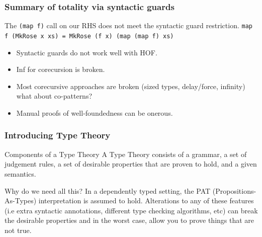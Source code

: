 \documentclass
  [hyperref={colorlinks = true,linkcolor = blue, 
             citecolor = blue, urlcolor = blue}
  ]{beamer}
\begin{document}
\begin{frame}[fragile]
  \frametitle{Summary of totality via syntactic guards}
  \begin{block}{The \texttt{(map f)} call on our RHS does not
    meet the syntactic guard restriction.}
  \texttt{map f (MkRose x xs) = MkRose (f x) (map (map f) xs)}
  \end{block}
  \begin{itemize}
    \item Syntactic guards do not work well with HOF.
    \item Inf for corecursion is broken.
    \item Most corecursive approaches are broken (sized types,
    delay/force, infinity) what about co-patterns?
    \item Manual proofs of well-foundedness can be onerous.
  \end{itemize}
\end{frame}

\begin{frame}[fragile]
  \frametitle{Introducing Type Theory}
  \begin{block}{Components of a Type Theory}
  A Type Theory consists of a grammar, a set of judgement rules, 
  a set of desirable properties that are proven to hold, and
  a given semantics.
  \end{block}
  \begin{block}{Why do we need all this?}
  In a dependently typed setting, the PAT (Propositions-As-Types)
  interpretation is assumed to hold. Alterations to any of these
  features (i.e extra syntactic annotations, different type
  checking algorithms, etc) can break the desirable properties
  and in the worst case, allow you to prove things that are not
  true.
  \end{block}

\end{frame}
\end{document}
